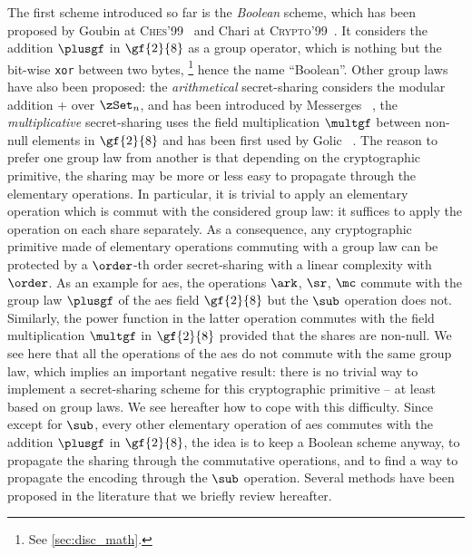 The first scheme introduced so far is the \emph{Boolean} scheme, which has been proposed by Goubin \etal{} at \textsc{Ches}'99~\cite{goubin_duplication_1999} and Chari \etal{} at \textsc{Crypto}'99~\cite{chari_towards_1999}.
It considers the addition \(\plusgf\) in \(\gf{2}{8}\) as a group operator, which is nothing but the bit-wise \verb+xor+ between two bytes,%
\footnote{
    See \autoref{sec:disc_math}.
}
hence the name ``Boolean''.
Other group laws have also been proposed: the \emph{arithmetical} secret-sharing considers the modular addition \(+\) over \(\zSet_n\), and has been introduced by Messerges \etal~\cite{messerges_arithmetic_2000}, the \emph{multiplicative} secret-sharing uses the field multiplication \(\multgf\) between non-null elements in \(\gf{2}{8}\) and has been first used by Golic \etal{}~\cite{golic_multiplicative_2002}.
The reason to prefer one group law from another is that depending on the cryptographic primitive, the sharing may be more or less easy to propagate through the elementary operations.
In particular, it is trivial to apply an elementary operation which is \gls{commut} with the considered group law: it suffices to apply the operation on each share separately.
As a consequence, any cryptographic primitive made of elementary operations commuting with a group law can be protected by a \(\order\)-th order secret-sharing with a linear complexity with \(\order\).
As an example for \gls{aes}, the operations \(\ark\), \(\sr\), \(\mc\) commute with the group law \(\plusgf\) of the \gls{aes} field \(\gf{2}{8}\) but the \(\sub\) operation does not.
Similarly, the power function in the latter operation commutes with the field multiplication \(\multgf\) in \(\gf{2}{8}\) provided that the shares are non-null.
We see here that all the operations of the \gls{aes} do not commute with the same group law, which implies an important negative result: there is no trivial way to implement a secret-sharing scheme for this cryptographic primitive -- at least based on group laws.
We see hereafter how to cope with this difficulty.
Since except for \(\sub\), every other elementary operation of \gls{aes} commutes with the addition \(\plusgf\) in \(\gf{2}{8}\), the idea is to keep a Boolean scheme anyway, to propagate the sharing through the commutative operations, and to find a way to propagate the encoding through the \(\sub\) operation.
Several methods have been proposed in the literature that we briefly review hereafter.

